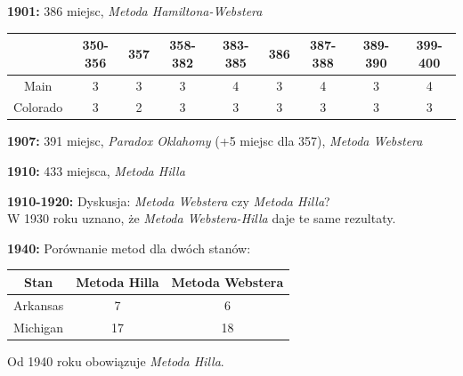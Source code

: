 \documentclass[12pt,a4paper]{article}
\theoremstyle{break}
\begin{document}
	\noindent \textbf{1901:} 386 miejsc, \textit{Metoda Hamiltona-Webstera}
	
	\begin{center}
		\begin{tabular}{|c|c|c|c|c|c|c|c|c|}
			\hline
			& 350-356 & 357 & 358-382 & 383-385 & 386 & 387-388 & 389-390 & 399-400 \\
			\hline
			Main & 3 & 3 & 3 & 4 & 3 & 4 & 3 & 4 \\
			\hline
			Colorado & 3 & 2 & 3 & 3 & 3 & 3 & 3 & 3 \\
			\hline
		\end{tabular}
	\end{center}
	
	\noindent \textbf{1907:} 391 miejsc, \textit{Paradox Oklahomy} (+5 miejsc dla 357), \textit{Metoda Webstera}
	
	\noindent \textbf{1910:} 433 miejsca, \textit{Metoda Hilla}
	
	\noindent \textbf{1910-1920:} Dyskusja: \textit{Metoda Webstera} czy \textit{Metoda Hilla}? \\
	W 1930 roku uznano, że \textit{Metoda Webstera-Hilla} daje te same rezultaty.
	
	\noindent \textbf{1940:} Porównanie metod dla dwóch stanów:
	
	\begin{center}
		\begin{tabular}{|c|c|c|}
			\hline
			Stan & Metoda Hilla & Metoda Webstera \\
			\hline
			Arkansas & 7 & 6 \\
			\hline
			Michigan & 17 & 18 \\
			\hline
		\end{tabular}
	\end{center}
	
	Od 1940 roku obowiązuje \textit{Metoda Hilla}.
	
\end{document}
